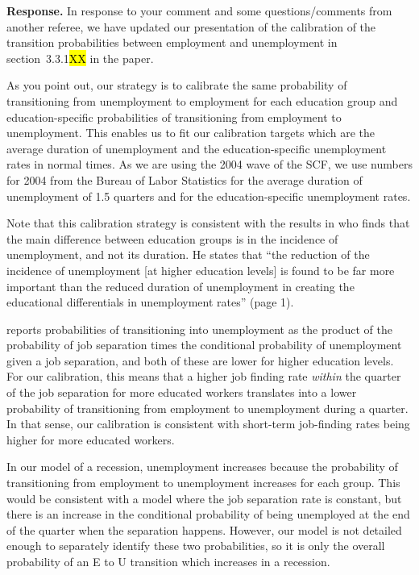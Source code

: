 \documentclass[12pt,letterpaper,english]{article}
\begin{document}
\begin{itemize}
	\noindent \textbf{Response.} In response to your comment and some questions/comments from another referee, we have updated our presentation of the calibration of the transition probabilities between employment and unemployment in section~3.3.1\hl{XX} in the paper. 
	
	As you point out, our strategy is to calibrate the same probability of transitioning from unemployment to employment for each education group and education-specific probabilities of transitioning from employment to unemployment. This enables us to fit our calibration targets which are the average duration of unemployment and the education-specific unemployment rates in normal times. As we are using the 2004 wave of the SCF, we use numbers for 2004 from the Bureau of Labor Statistics for the average duration of unemployment of 1.5 quarters and for the education-specific unemployment rates. 
	
	Note that this calibration strategy is consistent with the results in \citet{mincer1991education} who finds that the main difference between education groups is in the incidence of unemployment, and not its duration. He states that ``the reduction of the incidence of unemployment [at higher education levels] is found to be far more important than the reduced duration of unemployment in creating the educational differentials in unemployment rates'' (page 1).
	
	\citeauthor{mincer1991education} reports probabilities of transitioning into unemployment as the product of the probability of job separation times the conditional probability of unemployment given a job separation, and both of these are lower for higher education levels. For our calibration, this means that a higher job finding rate \textit{within} the quarter of the job separation for more educated workers translates into a lower probability of transitioning from employment to unemployment during a quarter. In that sense, our calibration is consistent with short-term job-finding rates being higher for more educated workers. 
	
	In our model of a recession, unemployment increases because the probability of transitioning from employment to unemployment increases for each group. This would be consistent with a model where the job separation rate is constant, but there is an increase in the conditional probability of being unemployed at the end of the quarter when the separation happens. However, our model is not detailed enough to separately identify these two probabilities, so it is only the overall probability of an E to U transition which increases in a recession. 
	

\end{itemize}
\end{document}
